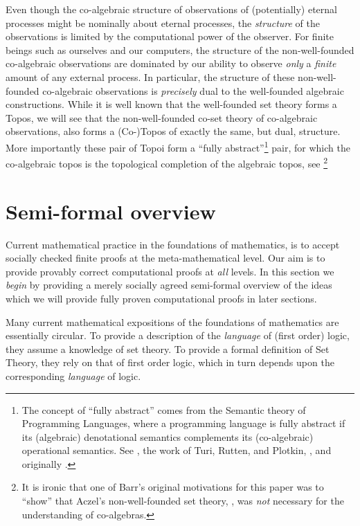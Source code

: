 Even though the co-algebraic structure of observations of (potentially) eternal
processes might be nominally about eternal processes, the \emph{structure} of
the observations is limited by the computational power of the observer. For
finite beings such as ourselves and our computers, the structure of the
non-well-founded co-algebraic observations are dominated by our ability to
observe \emph{only}  a \emph{finite} amount of any external process. In
particular, the structure of these non-well-founded co-algebraic observations is
\emph{precisely} dual to the well-founded algebraic constructions.  While it is
well known that the well-founded set theory forms a Topos, we will see that the
non-well-founded co-set theory of co-algebraic observations, also forms a
(Co-)Topos of exactly the same, but dual, structure. More importantly these pair
of Topoi form a ``fully abstract''\footnote{The concept of ``fully abstract''
comes from the Semantic theory of Programming Languages, where a programming
language is fully abstract if its (algebraic) denotational semantics complements
its (co-algebraic) operational semantics. See \cite[Section
2.4]{jacobs2012coalg}, the work of Turi, Rutten, and Plotkin,
\cite{turiRutten1998finalSemantics, turi1996operationalSemantics,
turiPlotkin1997operationalSemantics}, and originally \cite{plotkin1977lcf}.}
pair, for which the co-algebraic topos is the topological completion of the
algebraic topos, see \cite{barr1993terminalCoalgebrasWellFounded}\footnote{It is
ironic that one of Barr's original motivations for this paper was to ``show''
that Aczel's non-well-founded set theory, \cite{aczel1988nonWellFoundedSets},
was \emph{not} necessary for the understanding of co-algebras.}

\section{Semi-formal overview}

Current mathematical practice in the foundations of mathematics, is to accept
socially checked finite proofs at the meta-mathematical level. Our aim is to
provide provably correct computational proofs at \emph{all} levels. In this
section we \emph{begin} by providing a merely socially agreed semi-formal
overview of the ideas which we will provide fully proven computational proofs in
later sections.

Many current mathematical expositions of the foundations of mathematics are
essentially circular. To provide a description of the \emph{language} of (first
order) logic, they assume a knowledge of set theory. To provide a formal
definition of Set Theory, they rely on that of first order logic, which in turn
depends upon the corresponding \emph{language} of logic.

